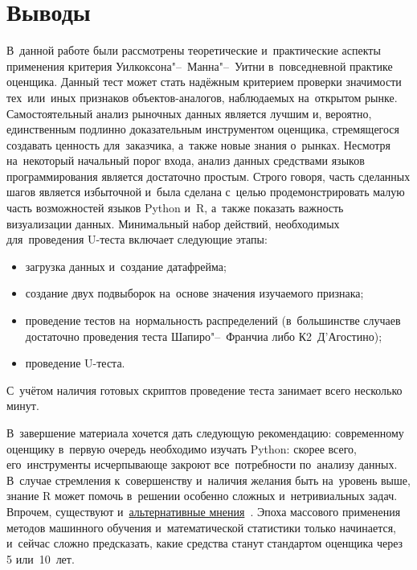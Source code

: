 \documentclass[]{scrreprt}
\begin{document}
\chapter{Выводы}
В~данной работе были рассмотрены теоретические и~практические аспекты применения критерия Уилкоксона"--~Манна"--~Уитни в~повседневной практике оценщика. Данный тест может стать надёжным критерием проверки значимости тех~или~иных признаков объектов-аналогов, наблюдаемых на~открытом рынке. Самостоятельный анализ рыночных данных является лучшим и, вероятно, единственным подлинно доказательным инструментом оценщика, стремящегося создавать ценность для~заказчика, а~также новые знания о~рынках. Несмотря на~некоторый начальный порог входа, анализ данных средствами языков программирования является достаточно простым. Строго говоря, часть сделанных шагов является избыточной и~была сделана с~целью продемонстрировать малую часть возможностей языков Python и~R, а~также показать важность визуализации данных. Минимальный набор действий, необходимых для~проведения U-теста включает следующие этапы:
\begin{itemize}
	\item загрузка данных и~создание датафрейма;
	\item создание двух подвыборок на~основе значения изучаемого признака;
	\item проведение тестов на~нормальность распределений (в~большинстве случаев достаточно проведения теста Шапиро"--~Франчиа либо К2~Д'Агостино);
	\item проведение U-теста.
\end{itemize}
С~учётом наличия готовых скриптов проведение теста занимает всего несколько минут.

В~завершение материала хочется дать следующую рекомендацию: современному оценщику в~первую очередь необходимо изучать Python: скорее всего, его~инструменты исчерпывающе закроют все~потребности по~анализу данных. В~случае стремления к~совершенству и~наличия желания быть на~уровень выше, знание R может помочь в~решении особенно сложных и~нетривиальных задач. Впрочем, существуют и~\href{https://habr.com/ru/post/670250/}{альтернативные мнения}~\cite{Habr:Python-or-R}. Эпоха массового применения методов машинного обучения и~математической статистики только начинается, и~сейчас сложно предсказать, какие средства станут стандартом оценщика через 5 или~10~лет.

\clearpage

\nocite{Essential-Statistical-Inference}
\nocite{AUC-optimization}
\nocite{Mann-Whitney-1947}
\nocite{Optimizing-classifier-performance}
\nocite{ROC-R-1}
\nocite{ROC-AUC-1}
\nocite{ROC-AUC-meets-U-R-1}


\printbibliography[title=Источники информации]
\end{document}
